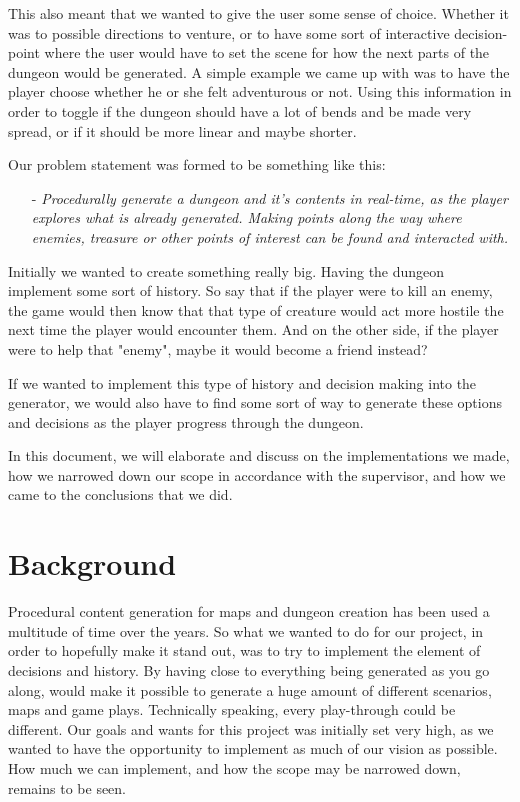 \documentclass[conference,compsoc]{IEEEtran}
\begin{document}
This also meant that we wanted to give the user some sense of choice. Whether it was to possible directions to venture, or to have some sort of interactive decision-point where the user would have to set the scene for how the next parts of the dungeon would be generated. A simple example we came up with was to have the player choose whether he or she felt adventurous or not. Using this information in order to toggle if the dungeon should have a lot of bends and be made very spread, or if it should be more linear and maybe shorter.

Our problem statement was formed to be something like this:
\begin{itemize}
\item[-] \textit{Procedurally generate a dungeon and it's contents in real-time, as the player explores what is already generated. Making points along the way where enemies, treasure or other points of interest can be found and interacted with.}
\end{itemize}

Initially we wanted to create something really big. Having the dungeon implement some sort of history. So say that if the player were to kill an enemy, the game would then know that that type of creature would act more hostile the next time the player would encounter them. And on the other side, if the player were to help that "enemy", maybe it would become a friend instead?

If we wanted to implement this type of history and decision making into the generator, we would also have to find some sort of way to generate these options and decisions as the player progress through the dungeon.

In this document, we will elaborate and discuss on the implementations we made, how we narrowed down our scope in accordance with the supervisor, and how we came to the conclusions that we did.
	
\section{Background}
Procedural content generation for maps and dungeon creation has been used a multitude of time over the years. So what we wanted to do for our project, in order to hopefully make it stand out, was to try to implement the element of decisions and history. By having close to everything being generated as you go along, would make it possible to generate a huge amount of different scenarios, maps and game plays. Technically speaking, every play-through could be different. 
Our goals and wants for this project was initially set very high, as we wanted to have the opportunity to implement as much of our vision as possible. How much we can implement, and how the scope may be narrowed down, remains to be seen.
\end{document}

